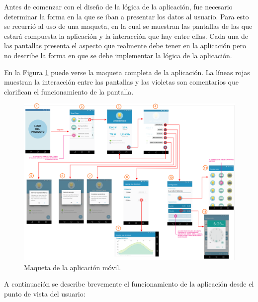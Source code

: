 Antes de comenzar con el diseño de la lógica de la aplicación, fue necesario determinar la forma en la que se iban a presentar los datos al usuario. Para esto se recurrió al uso de una maqueta, en la cual se muestran las pantallas de las que estará compuesta la aplicación y la interacción que hay entre ellas. Cada una de las pantallas presenta el aspecto que realmente debe tener en la aplicación pero no describe la forma en que se debe implementar la lógica de la aplicación.

En la Figura \ref{fig:app_wireframe} puede verse la maqueta completa de la aplicación. La líneas rojas muestran la interacción entre las pantallas y las violetas son comentarios que clarifican el funcionamiento de la pantalla.

\begin{figure}[!h]
	\centering
	\includegraphics[width=18cm, angle=90]{./Figures/3_3_1_app_wireframe.png}
	\caption{Maqueta de la aplicación móvil.}
	\label{fig:app_wireframe}
\end{figure}

A continuación se describe brevemente el funcionamiento de la aplicación desde el punto de vista del usuario:

